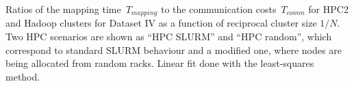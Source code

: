 \documentclass{article}
\begin{document}
\begin{center}

\end{center}
Ratios of the mapping time~$T_{mapping}$ to the communication costs~$T_{comm}$ for HPC2 and Hadoop clusters for Dataset IV as a function of reciprocal cluster size $1/N$. Two HPC scenarios are shown as ``HPC SLURM'' and ``HPC random'', which correspond to standard SLURM behaviour and a modified one, where nodes are being allocated from random racks.
Linear fit  done with the least-squares method.
\end{document}
